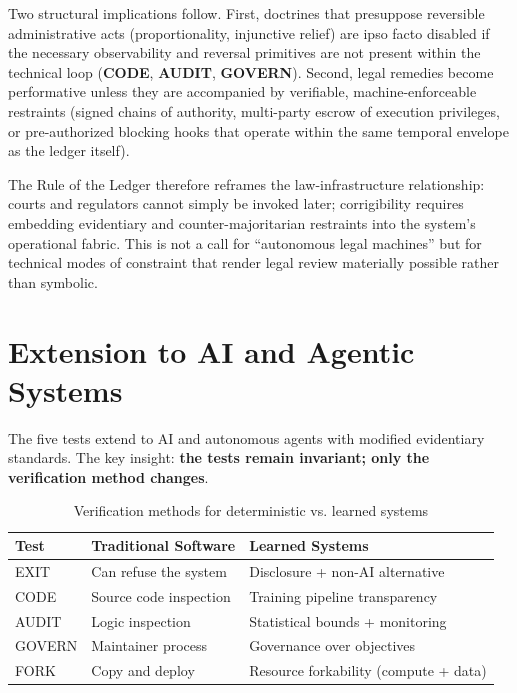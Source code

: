 \documentclass{article}
\begin{document}
Two structural implications follow. First, doctrines that presuppose reversible administrative acts (proportionality, injunctive relief) are ipso facto disabled if the necessary observability and reversal primitives are not present within the technical loop (\textbf{CODE}, \textbf{AUDIT}, \textbf{GOVERN}). Second, legal remedies become performative unless they are accompanied by verifiable, machine-enforceable restraints (signed chains of authority, multi-party escrow of execution privileges, or pre-authorized blocking hooks that operate within the same temporal envelope as the ledger itself).

The Rule of the Ledger therefore reframes the law-infrastructure relationship: courts and regulators cannot simply be invoked later; corrigibility requires embedding evidentiary and counter-majoritarian restraints into the system's operational fabric. This is not a call for ``autonomous legal machines'' but for technical modes of constraint that render legal review materially possible rather than symbolic.

\section{Extension to AI and Agentic Systems}
\label{sec:learned}

The five tests extend to AI and autonomous agents with modified evidentiary standards. The key insight: \textbf{the tests remain invariant; only the verification method changes}.

\begin{table}[htbp]
\centering
\small
\begin{tabular}{@{}lll@{}}
\toprule
\textbf{Test} & \textbf{Traditional Software} & \textbf{Learned Systems} \\
\midrule
EXIT & Can refuse the system & Disclosure + non-AI alternative \\
CODE & Source code inspection & Training pipeline transparency \\
AUDIT & Logic inspection & Statistical bounds + monitoring \\
GOVERN & Maintainer process & Governance over objectives \\
FORK & Copy and deploy & Resource forkability (compute + data) \\
\bottomrule
\end{tabular}
\caption{Verification methods for deterministic vs. learned systems}
\end{table}
\end{document}
